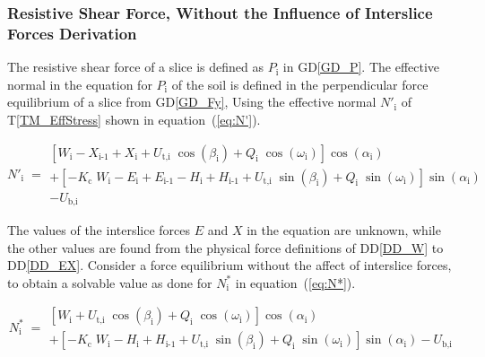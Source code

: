\documentclass[12pt]{article}
\newcommand{\tref}[1]{T\ref{#1}}
\newcommand{\ddref}[1]{DD\ref{#1}}
\newcommand{\dref}[1]{GD\ref{#1}}
\begin{document}

\subsubsection*{Resistive Shear Force, Without the
  Influence of Interslice Forces Derivation}

\noindent
The resistive shear force of a slice is defined as $P_\text{i}$ in
\dref{GD_P}.  The effective normal in the equation for $P_\text{i}$ of
the soil is defined in the perpendicular force equilibrium of a slice
from \dref{GD_Fy}, Using the effective normal $N'_\text{i}$ of
\tref{TM_EffStress} shown in equation~(\ref{eq:N'}).

\begin{equation} \label{eq:N'}
 N'_{\text{i}} \; = \begin{array}{l}
   \left[ W_{\text{i}} - X_{\text{i-1}} + X_{\text{i}} +
     {U_{\text{t,i}}}\;{\cos\left(\beta_{\text{i}}\right)} +
     Q_{\text{i}}\;{\cos\left(\omega_{\text{i}}\right)}
     \right]\cos\left(\alpha_{\text{i}}\right) \\ + \left[
     {-K_{\text{c}}}\;{W_{\text{i}}} - E_{\text{i}} + E_{\text{i-1}} -
     H_{\text{i}} + H_{\text{i-1}} +
     {U_{\text{t,i}}}\;{\sin\left(\beta_{\text{i}}\right)} +
     Q_{\text{i}}\;{\sin\left(\omega_{\text{i}}\right)}
     \right]\sin\left(\alpha_{\text{i}}\right) \\ -
   U_{\text{b,i}} \end{array}
 \end{equation}

\noindent
The values of the interslice forces $E$ and $X$ in the equation are
unknown, while the other values are found from the physical force
definitions of \ddref{DD_W} to \ddref{DD_EX}.  Consider a force
equilibrium without the affect of interslice
forces, to obtain a solvable value as done for $N^*_\text{i}$ in
equation~(\ref{eq:N*}).

\begin{equation} \label{eq:N*}
 N^*_{\text{i}} \; = \begin{array}{l}
   \left[ W_{\text{i}} +
     {U_{\text{t,i}}}\;{\cos\left(\beta_{\text{i}}\right)} +
     Q_{\text{i}}\;{\cos\left(\omega_{\text{i}}\right)}
     \right]\cos\left(\alpha_{\text{i}}\right) \\ + \left[
     {-K_{\text{c}}}\;{W_{\text{i}}}- H_{\text{i}} + H_{\text{i-1}} +
     {U_{\text{t,i}}}\;{\sin\left(\beta_{\text{i}}\right)} +
     Q_{\text{i}}\;{\sin\left(\omega_{\text{i}}\right)}
     \right]\sin\left(\alpha_{\text{i}}\right) -
   U_{\text{b,i}} \end{array}
\end{equation}
\end{document}
